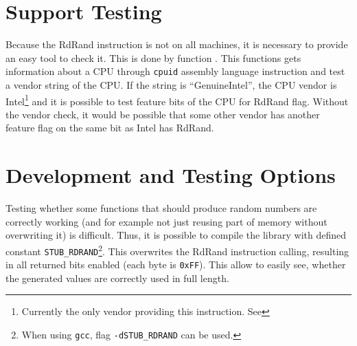 \section{Support Testing}
\par{
Because the RdRand instruction is not on all machines, it is necessary to provide an easy tool to check it. This is done by function . This functions gets information about a CPU through {\tt cpuid} assembly language instruction and test a vendor string of the CPU. If the string is ``GenuineIntel'', the CPU vendor is Intel\footnote{Currently the only vendor providing this instruction. See } and it is possible to test feature bits of the CPU for RdRand flag. Without the vendor check, it would be possible that some other vendor has another feature flag on the same bit as Intel has RdRand.
}

\section{Development and Testing Options}
\par{
Testing whether some functions that should produce random numbers are correctly working (and for example not just reusing part of memory without overwriting it) is difficult. Thus, it is possible to compile the library with defined constant {\tt STUB\_RDRAND}\footnote{When using {\tt gcc}, flag {\tt -dSTUB\_RDRAND} can be used.}. This overwrites the RdRand instruction calling, resulting in all returned bits enabled (each byte is {\tt 0xFF}). This allow to easily see, whether the generated values are correctly used in full length.
}

